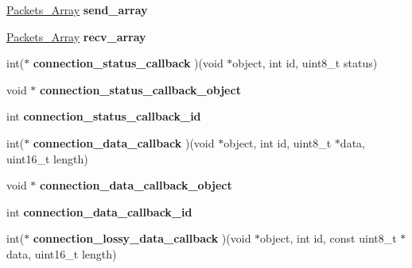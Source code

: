 \begin{DoxyCompactItemize}
\item 
\hypertarget{struct_crypto___connection_aa9112ee7e76eb3e870491f7c5c272197}{\hyperlink{struct_packets___array}{Packets\+\_\+\+Array} {\bfseries send\+\_\+array}}\label{struct_crypto___connection_aa9112ee7e76eb3e870491f7c5c272197}

\item 
\hypertarget{struct_crypto___connection_a1a62bc0c4bb9e349735c65f9948020d5}{\hyperlink{struct_packets___array}{Packets\+\_\+\+Array} {\bfseries recv\+\_\+array}}\label{struct_crypto___connection_a1a62bc0c4bb9e349735c65f9948020d5}

\item 
\hypertarget{struct_crypto___connection_ad3c663c15ca97b75951ea711b522c049}{int($\ast$ {\bfseries connection\+\_\+status\+\_\+callback} )(void $\ast$object, int id, uint8\+\_\+t status)}\label{struct_crypto___connection_ad3c663c15ca97b75951ea711b522c049}

\item 
\hypertarget{struct_crypto___connection_afe03d43c62ac2aa575a39e4308353244}{void $\ast$ {\bfseries connection\+\_\+status\+\_\+callback\+\_\+object}}\label{struct_crypto___connection_afe03d43c62ac2aa575a39e4308353244}

\item 
\hypertarget{struct_crypto___connection_a3cd6f7015115dc493f86be91526eb9f8}{int {\bfseries connection\+\_\+status\+\_\+callback\+\_\+id}}\label{struct_crypto___connection_a3cd6f7015115dc493f86be91526eb9f8}

\item 
\hypertarget{struct_crypto___connection_adc6ee264e4a5758049c6299beb81ce6d}{int($\ast$ {\bfseries connection\+\_\+data\+\_\+callback} )(void $\ast$object, int id, uint8\+\_\+t $\ast$data, uint16\+\_\+t length)}\label{struct_crypto___connection_adc6ee264e4a5758049c6299beb81ce6d}

\item 
\hypertarget{struct_crypto___connection_a3c44dfac7528ae10a6d09bf812f36486}{void $\ast$ {\bfseries connection\+\_\+data\+\_\+callback\+\_\+object}}\label{struct_crypto___connection_a3c44dfac7528ae10a6d09bf812f36486}

\item 
\hypertarget{struct_crypto___connection_a7d50567cce6cb1b8ef983e64060d414e}{int {\bfseries connection\+\_\+data\+\_\+callback\+\_\+id}}\label{struct_crypto___connection_a7d50567cce6cb1b8ef983e64060d414e}

\item 
\hypertarget{struct_crypto___connection_ab5af8aad05ddc085e69ead928cc26313}{int($\ast$ {\bfseries connection\+\_\+lossy\+\_\+data\+\_\+callback} )(void $\ast$object, int id, const uint8\+\_\+t $\ast$data, uint16\+\_\+t length)}\label{struct_crypto___connection_ab5af8aad05ddc085e69ead928cc26313}


\end{DoxyCompactItemize}
